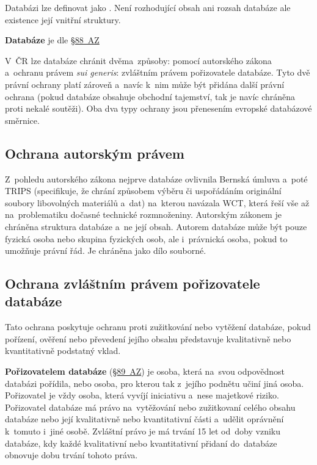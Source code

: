 Databázi lze definovat jako \emph{}. Není rozhodující obsah ani rozsah databáze ale existence její vnitřní struktury.

\textbf{Databáze} je dle \href{https://www.zakonyprolidi.cz/cs/2000-121#p88}{§88~AZ} \emph{}

V~ČR lze databáze chránit dvěma~způsoby: pomocí autorského zákona a~ochranu právem \emph{sui generis}: zvláštním právem pořizovatele databáze. Tyto dvě právní ochrany platí zároveň a~navíc k~nim může být přidána další právní ochrana (pokud databáze obsahuje obchodní tajemství, tak je navíc chráněna proti nekalé soutěži). Oba dva typy ochrany jsou přenesením evropské databázové směrnice.

\subsection{Ochrana autorským právem}

Z~pohledu autorského zákona nejprve databáze ovlivnila Bernská úmluva a~poté TRIPS (specifikuje, že chrání způsobem výběru či uspořádáním originální soubory libovolných materiálů a~dat) na~kterou navázala WCT, která řeší vše až na~problematiku dočasné technické rozmnoženiny. Autorským zákonem je chráněna struktura databáze a~ne její obsah. Autorem databáze může být pouze fyzická osoba nebo skupina fyzických osob, ale i~právnická osoba, pokud to umožňuje právní řád. Je chráněna jako dílo souborné.

\subsection{Ochrana zvláštním právem pořizovatele databáze}

Tato ochrana poskytuje ochranu proti zužitkování nebo vytěžení databáze, pokud pořízení, ověření nebo převedení jejího obsahu představuje kvalitativně nebo kvantitativně podstatný vklad.

\textbf{Pořizovatelem databáze} (\href{https://www.zakonyprolidi.cz/cs/2000-121#p89}{§89~AZ}) je osoba, která na~svou odpovědnost databázi pořídila, nebo osoba, pro kterou tak z~jejího podnětu učiní jiná osoba. Pořizovatel je vždy osoba, která vyvíjí iniciativu a~nese majetkové riziko. Pořizovatel databáze má právo na~vytěžování nebo zužitkovaní celého obsahu databáze nebo její kvalitativně nebo kvantitativní části a~udělit oprávnění k~tomuto i~jiné osobě. Zvláštní právo je má trvání 15 let od~doby vzniku databáze, kdy každé kvalitativní nebo kvantitativní přidaní do~databáze obnovuje dobu trvání tohoto práva.

